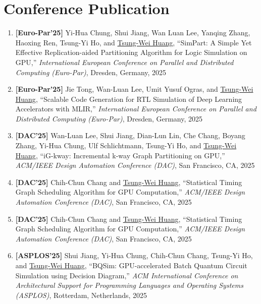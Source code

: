 \documentclass[A4,11pt]{article}
\begin{document}
\section{Conference Publication}
 \begin{enumerate}
 \itemsep-3pt
    
    \item \textbf{[Euro-Par'25]} Yi-Hua Chung, Shui Jiang, Wan Luan Lee, Yanqing Zhang, Haoxing Ren, Tsung-Yi Ho, and \underline{Tsung-Wei Huang}, ``SimPart: A Simple Yet Effective Replication-aided Partitioning Algorithm for Logic Simulation on GPU,'' \textit{International European Conference on Parallel and Distributed Computing (Euro-Par)}, Dresden, Germany, 2025
    
    \item \textbf{[Euro-Par'25]} Jie Tong, Wan-Luan Lee, Umit Yusuf Ogras, and \underline{Tsung-Wei Huang}, ``Scalable Code Generation for RTL Simulation of Deep Learning Accelerators with MLIR,'' \textit{International European Conference on Parallel and Distributed Computing (Euro-Par)}, Dresden, Germany, 2025

    \item \textbf{[DAC'25]} Wan-Luan Lee, Shui Jiang, Dian-Lun Lin, Che Chang, Boyang Zhang, Yi-Hua Chung, Ulf Schlichtmann, Tsung-Yi Ho, and \underline{Tsung-Wei Huang}, ``iG-kway: Incremental k-way Graph Partitioning on GPU,'' \textit{ACM/IEEE Design Automation Conference (DAC)}, San Francisco, CA, 2025
    
    \item \textbf{[DAC'25]} Chih-Chun Chang and \underline{Tsung-Wei Huang}, ``Statistical Timing Graph Scheduling Algorithm for GPU Computation,'' \textit{ACM/IEEE Design Automation Conference (DAC)}, San Francisco, CA, 2025

    \item \textbf{[DAC'25]} Chih-Chun Chang and \underline{Tsung-Wei Huang}, ``Statistical Timing Graph Scheduling Algorithm for GPU Computation,'' \textit{ACM/IEEE Design Automation Conference (DAC)}, San Francisco, CA, 2025

    \item \textbf{[ASPLOS'25]} Shui Jiang, Yi-Hua Chung, Chih-Chun Chang, Tsung-Yi Ho, and \underline{Tsung-Wei Huang}, ``BQSim: GPU-accelerated Batch Quantum Circuit Simulation using Decision Diagram,'' \textit{ACM International Conference on Architectural Support for Programming Languages and Operating Systems (ASPLOS)}, Rotterdam, Netherlands, 2025


\end{enumerate}
\end{document}
